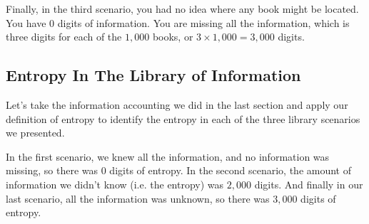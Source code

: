 \documentclass[11pt, oneside]{article}   	%
\begin{document}
Finally, in the third scenario, you had no idea where any book might be located.
You have $0$ digits of information.  You are missing all the information, which
is three digits for each of the $1,000$ books, or $3\times1,000=3,000$ digits.

\subsection{Entropy In The Library of Information}
Let's take the information accounting we did in the last section and apply our
definition of entropy to identify the entropy in each of the three library
scenarios we presented.

In the first scenario, we knew all the information, and no information was
missing, so there was $0$ digits of entropy.  In the second scenario, the amount
of information we didn't know (i.e. the entropy) was $2,000$ digits.  And
finally in our last scenario, all the information was unknown, so there was
$3,000$ digits of entropy.
\end{document}

